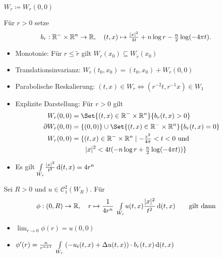 \documentclass{cheat-sheet}
\begin{document}
\begin{nota}
  $W_r \coloneqq W_r(0, 0)$
\end{nota}

\begin{nota}
  Für $r > 0$ setze
  \[
    b_r : \mathbb{R}^{-} \times \mathbb{R}^n \to \mathbb{R}, \quad
    (t, x) \mapsto \tfrac{\lvert x\rvert^2}{4t} + n \log r - \tfrac{n}{2} \log(-4 \pi t).
  \]
\end{nota}

\begin{bemn}
  \begin{itemize}
    \item Monotonie: Für $r \leq \tilde{r}$ gilt $W_r(x_0) \subseteq W_{\tilde{r}}(x_0)$
    \item Translationsinvarianz: $W_r(t_0, x_0) = (t_0, x_0) + W_r(0, 0)$
    \item Parabolische Reskalierung: $(t, x) \in W_r \iff (r^{-2}t, r^{-1}x) \in W_1$
    \item Explizite Darstellung: Für $r > 0$ gilt
    \begin{align*}
      W_r(0, 0) &= \Set{(t, x) \in \R^{-} \times \R^n}{b_r(t, x) > 0}\\
      \partial W_r(0, 0) &= \{ (0, 0) \} \cup \Set{(t, x) \in \R^{-} \times \R^n}{b_r(t,x) = 0}\\
      W_r(0, 0) &= \{ (t, x) \in \R^{-} \times \R^n \mid - \tfrac{r^2}{4 \pi} < t < 0 \text{ und }\\
      & \qquad \abs{x}^2 < 4t (-n \log r + \tfrac{n}{2} \log (-4 \pi t)) \}
    \end{align*}
    \item Es gilt ${\textstyle \int\limits_{W_r}^{}} \tfrac{\lvert x\rvert^2}{t^2} \,\mathrm{d} (t,x) = 4 r^n$
  \end{itemize}
\end{bemn}

\begin{lem}
  Sei $R > 0$ und $u \in \mathcal{C}^2_1(W_R)$. Für
  \[
    \phi : \left( 0, R \right) \to \mathbb{R}, \quad
    r \mapsto \frac{1}{4 r^n} \enspace {\textstyle \int\limits_{W_r}^{}} u(t,x) \frac{\lvert x\rvert^2}{t^2} \,\mathrm{d} (t,x)
    \qquad \text{gilt dann}
  \]
  \begin{itemize}
    \item $\lim_{r \to 0} \phi(r) = u(0,0)$
    \item $\phi'(r) = \frac{n}{r^{n+1}} \enspace {\textstyle \int\limits_{W_r}^{}} \left( -u_t(t,x) + \Delta u(t,x) \right) \cdot b_r(t, x) \,\mathrm{d} (t,x)$
  \end{itemize}
\end{lem}
\end{document}
